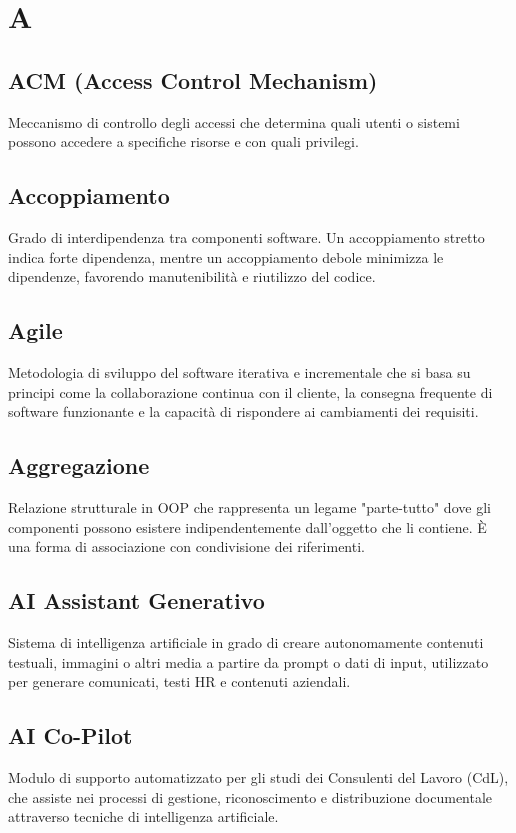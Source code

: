 \documentclass[a4paper,11pt]{article}
\begin{document}
\newpage

\section{A}

\subsection{ACM (Access Control Mechanism)}
Meccanismo di controllo degli accessi che determina quali utenti o sistemi possono accedere a specifiche risorse e con quali privilegi.

\subsection{Accoppiamento}
Grado di interdipendenza tra componenti software. Un accoppiamento stretto indica forte dipendenza, mentre un accoppiamento debole minimizza le dipendenze, favorendo manutenibilità e riutilizzo del codice.

\subsection{Agile}
Metodologia di sviluppo del software iterativa e incrementale che si basa su principi come la collaborazione continua con il cliente, la consegna frequente di software funzionante e la capacità di rispondere ai cambiamenti dei requisiti.

\subsection{Aggregazione}
Relazione strutturale in OOP che rappresenta un legame "parte-tutto" dove gli componenti possono esistere indipendentemente dall'oggetto che li contiene. È una forma di associazione con condivisione dei riferimenti.

\subsection{AI Assistant Generativo}
Sistema di intelligenza artificiale in grado di creare autonomamente contenuti testuali, immagini o altri media a partire da prompt o dati di input, utilizzato per generare comunicati, testi HR e contenuti aziendali.

\subsection{AI Co-Pilot}
Modulo di supporto automatizzato per gli studi dei Consulenti del Lavoro (CdL), che assiste nei processi di gestione, riconoscimento e distribuzione documentale attraverso tecniche di intelligenza artificiale.
\end{document}
